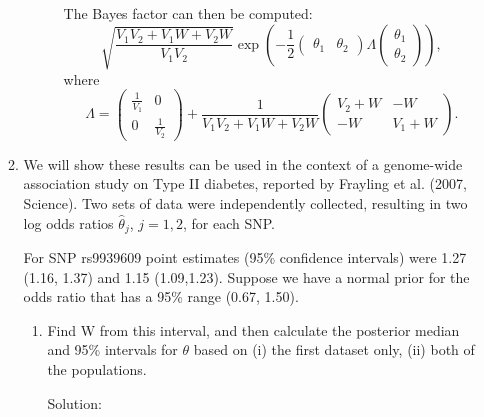 \documentclass[letterpaper,11pt]{article}
\begin{document}
\begin{enumerate}
\begin{enumerate}
\begin{description}
      The Bayes factor can then be computed:
      \begin{equation}
        \sqrt{\frac{V_1V_2 + V_1W + V_2W}{V_1V_2}}
        \exp\left(
          -\frac{1}{2}
          \begin{pmatrix}
            \theta_1 & \theta_2
          \end{pmatrix}
          \Lambda
          \begin{pmatrix}
            \theta_1 \\ \theta_2
          \end{pmatrix}
        \right),
      \end{equation}
      where \begin{equation}
        \Lambda =
        \begin{pmatrix}
          \frac{1}{V_1} & 0 \\
          0 & \frac{1}{V_2}
        \end{pmatrix}
        + \frac{1}{V_1V_2 + V_1W + V_2W}
        \begin{pmatrix}
          V_2 + W & -W \\
          -W & V_1 + W
        \end{pmatrix}.
      \end{equation}
    \end{description}
  \item We will show these results can be used in the context of a genome-wide
    association study on Type II diabetes, reported by Frayling et al. (2007,
    Science). Two sets of data were independently collected, resulting in two
    log odds ratios $\hat{\theta}_j$, $j = 1,2$, for each SNP.
     
    For SNP rs9939609 point estimates (95\% confidence intervals) were 1.27
    (1.16, 1.37) and 1.15 (1.09,1.23). Suppose we have a normal prior for the
    odds ratio that has a 95\% range (0.67, 1.50).

    \begin{enumerate}
    \item Find W from this interval, and then calculate the posterior median and
      95\% intervals for $\theta$ based on (i) the first dataset only, (ii) both
      of the populations.
      \begin{description}
      \item[Solution:] 
      \end{description}
      

\end{enumerate}
\end{enumerate}
\end{enumerate}
\end{document}
